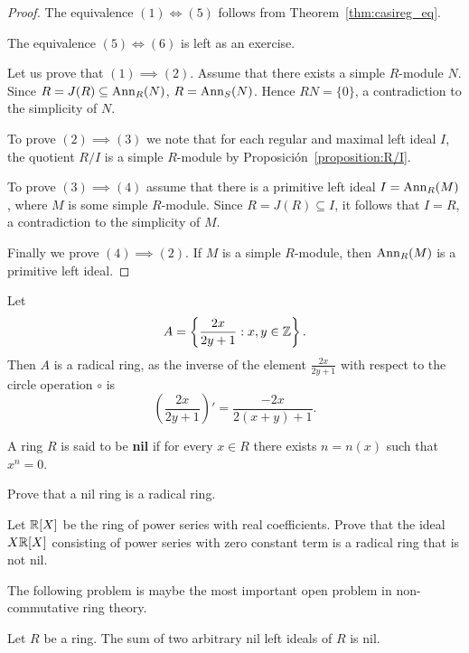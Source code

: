 \begin{proof}
	The equivalence $(1)\Longleftrightarrow(5)$ follows from 
	Theorem~\ref{thm:casireg_eq}. 
    
    The equivalence $(5)\Longleftrightarrow(6)$ is left as an exercise. 

	Let us prove that $(1)\implies(2)$. Assume that there exists a simple $R$-module $N$. Since 
	$R=J(R)\subseteq\operatorname{Ann}_R(N)$, $R=\operatorname{Ann}_S(N)$. 
	Hence $RN=\{0\}$, a contradiction to the simplicity of $N$.
	
	To prove $(2)\implies(3)$ we note that for each regular and maximal left ideal 
	$I$, the quotient $R/I$ is a simple $R$-module by
	Proposición~\ref{proposition:R/I}. 
	
	To prove $(3)\implies(4)$ assume that there is a primitive left ideal 
	$I=\operatorname{Ann}_R(M)$, where $M$ is some simple $R$-module. Since $R=J(R)\subseteq I$, it follows that  
    $I=R$, a contradiction to the simplicity of $M$.

	Finally we prove $(4)\implies(2)$. If $M$ is a simple $R$-module, then 
	$\operatorname{Ann}_R(M)$ is a primitive left ideal.
\end{proof}

\begin{example}
	Let 
	\[
	A=\left\{\frac{2x}{2y+1}:x,y\in\mathbb{Z}\right\}.
	\]
	Then $A$ is a radical ring, as the inverse of the element $\frac{2x}{2y+1}$
	with respect to the circle operation 
	$\circ$ is 
	\[
	\left(\frac{2x}{2y+1}\right)'=\frac{-2x}{2(x+y)+1}.
	\]
\end{example}

A ring $R$ is said to be \textbf{nil} if for every $x\in R$ there
exists $n=n(x)$ such that $x^n=0$. 

\begin{exercise}
    Prove that a nil ring is a radical ring. 
\end{exercise}

\begin{exercise}
    Let $\mathbb{R}[X]$ be the ring of power series with real coefficients. Prove that the ideal 
    $X\mathbb{R}[X]$ consisting of power series with zero constant term is a radical ring
    that is not nil. 
\end{exercise}

The following problem is maybe the most important open 
problem in non-commutative ring theory. 

\begin{conjecture}[K\"othe]
\label{conj:Koethe}
Let $R$ be a ring. 
The sum of two arbitrary nil left ideals of $R$ is nil.  
\end{conjecture}

